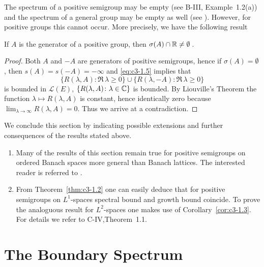 The spectrum of a positive semigroup may be empty (see B-III, Example~1.2(a)) and the spectrum of a general group may be empty as well (see \citet[Section~23.16]{hillephillips:1957}).
However, for positive groups this cannot occur.
More precisely, we have the following result
\begin{corollary}\label{cor:c3-1.6}
If $A$ is the generator of a positive group, then $\sigma(A)\cap\mathbb{R}  \neq \emptyset$\,.
\end{corollary}

\begin{proof}
Both $A$ and $-A$ are generators of positive semigroups, hence if $\sigma(A) = \emptyset$, then $s(A) = s(-A) = -\infty$ and \eqref{eq:c3-1.5} implies that 
\[
\{R(\lambda,A) \colon \Re\, \lambda \geq 0\} \cup \{R(\lambda,-A) \colon \Re\, \lambda \geq 0\}
\]
is bounded in $\mathcal{L}(E)$, \ie  $\{R(\lambda,A) \colon \lambda \in \mathbb{C} \}$ is bounded.
By Liouville's Theorem the function $\lambda \mapsto R(\lambda,A)$ is constant, hence identically zero because $\lim_{\lambda\to\infty}R(\lambda,A) = 0$.
Thus we arrive at a contradiction.
\end{proof}

We conclude this section by indicating possible extensions and further consequences of the results stated above.

\begin{remarks}\label{rem:c3-1.7}
\begin{enumerate}[\upshape (i), wide, labelsep=1em, itemsep=1ex]
	\item 
	Many of the results of this section remain true for positive semigroups on ordered Banach spaces more general than Banach lattices.
	The interested reader is referred to \citet{greinervoigtwolff:1981}.
	
	\item 
	From Theorem~\ref{thm:c3-1.2} one can easily deduce that for positive semigroups on $L^1$-spaces spectral bound and growth bound coincide.
	To prove the analoguous result for $L^2$-spaces one makes use of Corollary~\ref{cor:c3-1.3}.
	For details we refer to C-IV,Theorem~1.1.
\end{enumerate}
\end{remarks}
%
\section{The Boundary Spectrum}\label{sec:c3-2}

